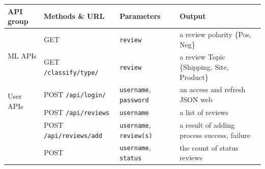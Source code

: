 \begin{table}[!htbp]

  \small
  \begin{center}
      \begin{tabular}{|p{}|p{}|p{}|p{}|}
      \toprule

      {\bf API group} & {\bf Methods \& URL} & {\bf Parameters} & {\bf Output}  
\\
      \midrule\midrule[.1em]
      \multirow{2}{1cm}{ML APIs} 
                      & GET  \hspace{5mm}{\tt /classify/polarity/}
                                   & {\tt review}%
                                   & a review polarity \{Pos, Neg\}
                                   \\
      \cmidrule(lr){2-4}
                       & GET  \hspace{10mm} {\tt /classify/type/}
                                   & {\tt review}
                                   & a review Topic \{Shipping, Site, Product\} \\ 
  \midrule[.1em] 

      \multirow{2}{3.5cm}{User APIs} 
                                   & POST \hspace{20mm} {\tt /api/login/}
                                   & {\tt username}, {\tt password }
                                  & an access and refresh JSON web \\
      \cmidrule(lr){2-4}
                       & POST \hspace{20mm}  {\tt /api/reviews}
                      & {\tt username}
                                                      & a list of reviews \\   
  \cmidrule(lr){2-4}
                      &POST \hspace{10mm} {\tt /api/reviews/add}
                      & {\tt username}, {\tt review(s)}
                      & a result of adding process {success, failure}\\   

  \cmidrule(lr){2-4}
                      & POST \hspace{2mm}{\tt /api/reviews/status}
                                   & {\tt username},
                                   {\tt    status}
                                                      & the count of status reviews \\   


\end{tabular}
\end{center}
\end{table}
